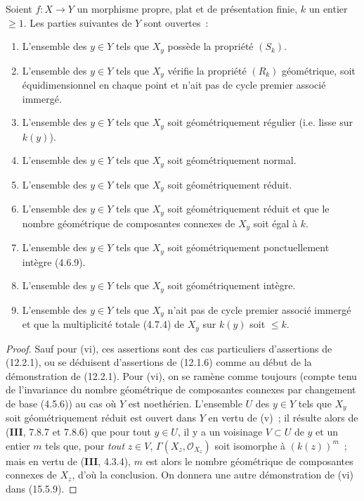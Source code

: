 \begin{theorem}[12.2.4]
\label{IV.12.2.4-fr}
Soient $f:X\to Y$ un morphisme propre, plat et de présentation finie, $k$ un
entier $\geq 1$. Les parties suivantes de $Y$ sont ouvertes~:
\begin{enumerate}[label=(\roman*)]
  \item L'ensemble des $y\in Y$ tels que $X_y$ possède la propriété $(S_k)$.
  \item L'ensemble des $y\in Y$ tels que $X_y$ vérifie la propriété $(R_k)$
  géométrique, soit équidimensionnel en chaque point et n'ait pas de cycle
  premier associé immergé.
  \item L'ensemble des $y\in Y$ tels que $X_y$ soit géométriquement régulier
  (i.e. lisse sur $k(y)$).
  \item L'ensemble des $y\in Y$ tels que $X_y$ soit géométriquement normal.
  \item L'ensemble des $y\in Y$ tels que $X_y$ soit géométriquement réduit.
  \item L'ensemble des $y\in Y$ tels que $X_y$ soit géométriquement réduit et
  que le nombre géométrique de composantes connexes de $X_y$ soit égal à $k$.
  \item L'ensemble des $y\in Y$ tels que $X_y$ soit géométriquement
  ponctuellement intègre (4.6.9).
  \item L'ensemble des $y\in Y$ tels que $X_y$ soit géométriquement intègre.
  \item L'ensemble des $y\in Y$ tels que $X_y$ n'ait pas de cycle premier
  associé immergé et que la multiplicité totale (4.7.4) de $X_y$ sur $k(y)$
  soit $\leq k$.
\end{enumerate}
\end{theorem}

\begin{proof}
Sauf pour (vi), ces assertions sont des cas particuliers d'assertions de
(12.2.1), ou se déduisent d'assertions de (12.1.6) comme au début de la
démonstration de (12.2.1). Pour (vi), on se ramène comme toujours (compte tenu
de l'invariance du nombre géométrique de composantes connexes par changement
de base (4.5.6)) au cas où $Y$ est noethérien. L'ensemble $U$ des $y\in Y$ tels
que $X_y$ soit géométriquement réduit est ouvert dans $Y$ en vertu de (v)~; il
résulte alors de (\textbf{III}, 7.8.7 et 7.8.6) que pour tout $y\in U$, il y a
un voisinage $V\subset U$ de $y$ et un entier $m$ tels que, pour \emph{tout}
$z\in V$, $\Gamma(X_z,\mathcal O_{X_z})$ soit isomorphe à $(k(z))^m$~; mais en
vertu de (\textbf{III}, 4.3.4), $m$ est alors le nombre géométrique de
composantes connexes de $X_z$, d'où la conclusion. On donnera une autre
démonstration de (vi) dans (15.5.9).
\end{proof}

